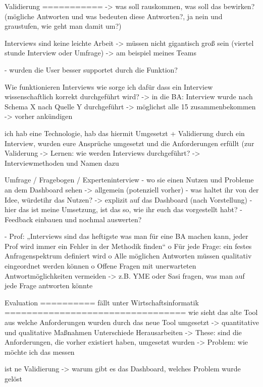Validierung
===========
-> was soll rauskommen, was soll das bewirken? (mögliche Antworten und was bedeuten diese Antworten?, ja nein und graustufen, wie geht man damit um?)

Interviews sind keine leichte Arbeit
-> müssen nicht gigantisch groß sein (viertel stunde Interview oder Umfrage)
-> am beispiel meines Teams

- wurden die User besser supportet durch die Funktion?

Wie funktionieren Interviews
wie sorge ich dafür dass ein Interview wissenschaftlich korrekt durchgeführt wird?
-> in die BA: Interview wurde nach Schema X nach Quelle Y durchgeführt
-> möglichst alle 15 zusammenbekommen
-> vorher ankündigen

ich hab eine Technologie, hab das hiermit Umgesetzt + Validierung durch ein Interview, wurden eure Ansprüche umgesetzt und die Anforderungen erfüllt (zur Validerung
-> Lernen: wie werden Interviews durchgeführt?
-> Interviewmethoden und Namen dazu

Umfrage / Fragebogen / Experteninterview - wo sie einen Nutzen und Probleme an dem Dashboard sehen
-> allgemein (potenziell vorher) - was haltet ihr von der Idee, würdetihr das Nutzen?
-> explizit auf das Dashboard (nach Vorstellung) - hier das ist meine Umsetzung, ist das so, wie ihr euch das vorgestellt habt?
- Feedback einbauen und nochmal auswerten?

-	Prof: „Interviews sind das heftigste was man für eine BA machen kann, jeder Prof wird immer ein Fehler in der Methodik finden“
o	Für jede Frage: ein festes Anfragenspektrum definiert wird
o	Alle möglichen Antworten müssen qualitativ eingeordnet werden können
o	Offene Fragen mit unerwarteten Antwortmöglichkeiten vermeiden
-> z.B. YME oder Sasi fragen, was man auf jede Frage antworten könnte


Evaluation
==========
fällt unter Wirtschaftsinformatik
=================================
wie sieht  das alte Tool aus
welche Anforderungen wurden durch das neue Tool umgesetzt
-> quantitative und qualitative Maßnahmen
Unterschiede Herausarbeiten
-> These: sind die Anforderungen, die vorher existiert haben, umgesetzt wurden
-> Problem: wie möchte ich das messen

ist ne Validierung
-> warum gibt es das Dashboard, welches Problem wurde gelöst

